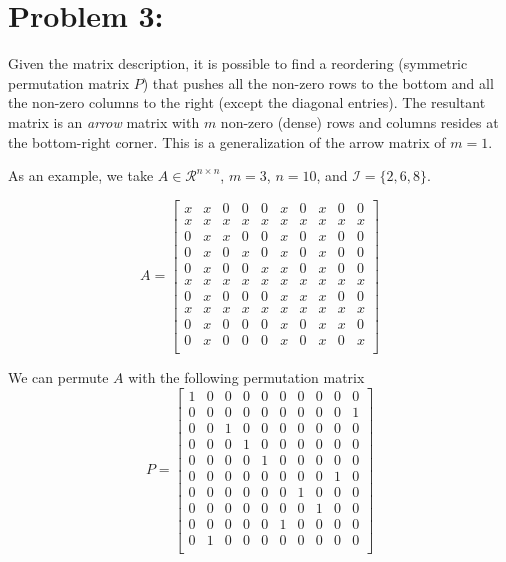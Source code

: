 \newpage
\section*{Problem 3:}
Given the matrix description, it is possible to find a reordering (symmetric permutation matrix $P$) that pushes all the non-zero rows to the bottom and all the non-zero columns to the right (except the diagonal entries). The resultant matrix is an \emph{arrow} matrix with $m$ non-zero (dense) rows and columns resides at the bottom-right corner. This is a generalization of the arrow matrix of $m =1$. 

As an example, we take $A \in \mathcal{R}^{n \times n}$, $m= 3$, $n=10$, and $\mathcal{I}=\{2, 6, 8\}$. 


$$
A = 
\begin{bmatrix}
x & x & 0 & 0 & 0 & x & 0 & x & 0 & 0\\
x & x & x & x & x & x & x & x & x & x\\
0 & x & x & 0 & 0 & x & 0 & x & 0 & 0\\
0 & x & 0 & x & 0 & x & 0 & x & 0 & 0\\
0 & x & 0 & 0 & x & x & 0 & x & 0 & 0\\
x & x & x & x & x & x & x & x & x & x\\
0 & x & 0 & 0 & 0 & x & x & x & 0 & 0\\
x & x & x & x & x & x & x & x & x & x\\
0 & x & 0 & 0 & 0 & x & 0 & x & x & 0\\
0 & x & 0 & 0 & 0 & x & 0 & x & 0 & x\\        
\end{bmatrix}
$$

We can permute $A$ with the following permutation matrix 
$$
P = 
\begin{bmatrix}
1 & 0 & 0 & 0 & 0 & 0 & 0 & 0 & 0 & 0\\
0 & 0 & 0 & 0 & 0 & 0 & 0 & 0 & 0 & 1\\
0 & 0 & 1 & 0 & 0 & 0 & 0 & 0 & 0 & 0\\
0 & 0 & 0 & 1 & 0 & 0 & 0 & 0 & 0 & 0\\
0 & 0 & 0 & 0 & 1 & 0 & 0 & 0 & 0 & 0\\
0 & 0 & 0 & 0 & 0 & 0 & 0 & 0 & 1 & 0\\
0 & 0 & 0 & 0 & 0 & 0 & 1 & 0 & 0 & 0\\
0 & 0 & 0 & 0 & 0 & 0 & 0 & 1 & 0 & 0\\
0 & 0 & 0 & 0 & 0 & 1 & 0 & 0 & 0 & 0\\
0 & 1 & 0 & 0 & 0 & 0 & 0 & 0 & 0 & 0\\       
\end{bmatrix}
$$


